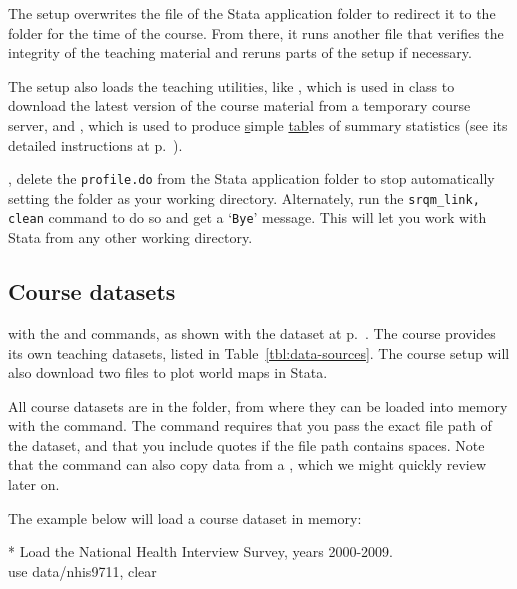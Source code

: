 	The setup overwrites the  file of the Stata application folder to redirect it to the \SRQM folder for the time of the course. From there, it runs another  file that verifies the integrity of the teaching material and reruns parts of the setup if necessary.%
		
	The setup also loads the  teaching utilities, like , which is used in class to download the latest version of the course material from a temporary course server, and , which is used to produce \underline{s}imple \underline{tab}les of summary statistics (see its detailed instructions at p.~\pageref{cmd:stab}).%
		
  , delete the \texttt{profile.do} from the Stata application folder to stop automatically setting the \SRQM folder as your working directory. Alternately, run the \texttt{srqm\_link, clean} command to do so and get a `\texttt{Bye}' message. This will let you work with Stata from any other working directory.%

%
%
\subsection{Course datasets}
	\label{sec:data-sources}

   with the  and  commands, as shown with the  dataset at p.~\pageref{lifeexp}. The course provides its own teaching datasets, listed in Table~\ref{tbl:data-sources}. The course setup will also download two files to plot world maps in Stata.%

  

	All course datasets are in the \data folder, from where they can be loaded into memory with the  command. The command requires that you pass the exact file path of the dataset, and that you include quotes if the file path contains spaces. Note that the  command can also copy data from a \URL, which we might quickly review later on.%

  The example below will load a course dataset in memory:%

		\begin{docspec}
			* Load the National Health Interview Survey, years 2000-2009.\\
			use data/nhis9711, clear
		\end{docspec}

